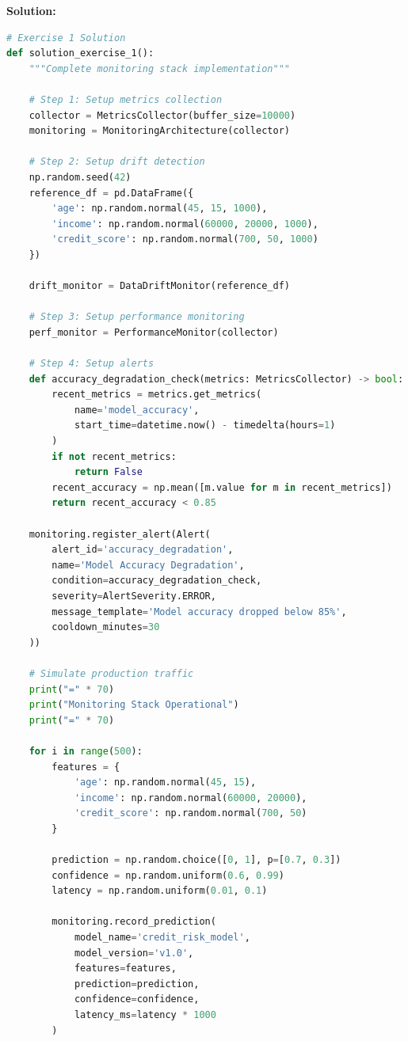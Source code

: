 \textbf{Solution:}
\begin{lstlisting}[language=Python]
# Exercise 1 Solution
def solution_exercise_1():
    """Complete monitoring stack implementation"""

    # Step 1: Setup metrics collection
    collector = MetricsCollector(buffer_size=10000)
    monitoring = MonitoringArchitecture(collector)

    # Step 2: Setup drift detection
    np.random.seed(42)
    reference_df = pd.DataFrame({
        'age': np.random.normal(45, 15, 1000),
        'income': np.random.normal(60000, 20000, 1000),
        'credit_score': np.random.normal(700, 50, 1000)
    })

    drift_monitor = DataDriftMonitor(reference_df)

    # Step 3: Setup performance monitoring
    perf_monitor = PerformanceMonitor(collector)

    # Step 4: Setup alerts
    def accuracy_degradation_check(metrics: MetricsCollector) -> bool:
        recent_metrics = metrics.get_metrics(
            name='model_accuracy',
            start_time=datetime.now() - timedelta(hours=1)
        )
        if not recent_metrics:
            return False
        recent_accuracy = np.mean([m.value for m in recent_metrics])
        return recent_accuracy < 0.85

    monitoring.register_alert(Alert(
        alert_id='accuracy_degradation',
        name='Model Accuracy Degradation',
        condition=accuracy_degradation_check,
        severity=AlertSeverity.ERROR,
        message_template='Model accuracy dropped below 85%',
        cooldown_minutes=30
    ))

    # Simulate production traffic
    print("=" * 70)
    print("Monitoring Stack Operational")
    print("=" * 70)

    for i in range(500):
        features = {
            'age': np.random.normal(45, 15),
            'income': np.random.normal(60000, 20000),
            'credit_score': np.random.normal(700, 50)
        }

        prediction = np.random.choice([0, 1], p=[0.7, 0.3])
        confidence = np.random.uniform(0.6, 0.99)
        latency = np.random.uniform(0.01, 0.1)

        monitoring.record_prediction(
            model_name='credit_risk_model',
            model_version='v1.0',
            features=features,
            prediction=prediction,
            confidence=confidence,
            latency_ms=latency * 1000
        )


\end{lstlisting}
